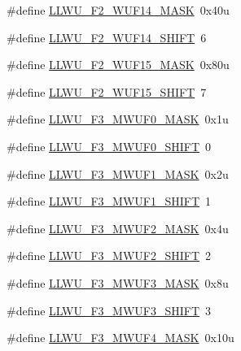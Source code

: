 \begin{DoxyCompactItemize}
\item 
\#define \hyperlink{group___l_l_w_u___register___masks_ga5f6f604b22d249edf1101cd9aa087072}{L\+L\+W\+U\+\_\+\+F2\+\_\+\+W\+U\+F14\+\_\+\+M\+A\+SK}~0x40u
\item 
\#define \hyperlink{group___l_l_w_u___register___masks_ga775751b74c858d4adf406ff063630bbf}{L\+L\+W\+U\+\_\+\+F2\+\_\+\+W\+U\+F14\+\_\+\+S\+H\+I\+FT}~6
\item 
\#define \hyperlink{group___l_l_w_u___register___masks_gaa56b2f78b177bd14e66b3863dbb14625}{L\+L\+W\+U\+\_\+\+F2\+\_\+\+W\+U\+F15\+\_\+\+M\+A\+SK}~0x80u
\item 
\#define \hyperlink{group___l_l_w_u___register___masks_gaae1c32b7e20bbc817c4c5af4479e2a91}{L\+L\+W\+U\+\_\+\+F2\+\_\+\+W\+U\+F15\+\_\+\+S\+H\+I\+FT}~7
\item 
\#define \hyperlink{group___l_l_w_u___register___masks_ga1bb6bf136de15f4cc67eee67d53361a9}{L\+L\+W\+U\+\_\+\+F3\+\_\+\+M\+W\+U\+F0\+\_\+\+M\+A\+SK}~0x1u
\item 
\#define \hyperlink{group___l_l_w_u___register___masks_ga3b2c7982efa30073491d05e0dbc698e8}{L\+L\+W\+U\+\_\+\+F3\+\_\+\+M\+W\+U\+F0\+\_\+\+S\+H\+I\+FT}~0
\item 
\#define \hyperlink{group___l_l_w_u___register___masks_gafe847acbd5a46291dd05b8ab682efffe}{L\+L\+W\+U\+\_\+\+F3\+\_\+\+M\+W\+U\+F1\+\_\+\+M\+A\+SK}~0x2u
\item 
\#define \hyperlink{group___l_l_w_u___register___masks_ga6de4a2380bde727b70758cd1c818c859}{L\+L\+W\+U\+\_\+\+F3\+\_\+\+M\+W\+U\+F1\+\_\+\+S\+H\+I\+FT}~1
\item 
\#define \hyperlink{group___l_l_w_u___register___masks_ga3414123c30550a3dea14d84f931e2a0c}{L\+L\+W\+U\+\_\+\+F3\+\_\+\+M\+W\+U\+F2\+\_\+\+M\+A\+SK}~0x4u
\item 
\#define \hyperlink{group___l_l_w_u___register___masks_gac83dee08de7a4bdce21d454a9cfab059}{L\+L\+W\+U\+\_\+\+F3\+\_\+\+M\+W\+U\+F2\+\_\+\+S\+H\+I\+FT}~2
\item 
\#define \hyperlink{group___l_l_w_u___register___masks_gab85f671f2c6f2112c4e2e14845ef998b}{L\+L\+W\+U\+\_\+\+F3\+\_\+\+M\+W\+U\+F3\+\_\+\+M\+A\+SK}~0x8u
\item 
\#define \hyperlink{group___l_l_w_u___register___masks_ga91a71ba06b95076252cd2594112da05d}{L\+L\+W\+U\+\_\+\+F3\+\_\+\+M\+W\+U\+F3\+\_\+\+S\+H\+I\+FT}~3
\item 
\#define \hyperlink{group___l_l_w_u___register___masks_gabd85c849a3b177444a91aa37457252a8}{L\+L\+W\+U\+\_\+\+F3\+\_\+\+M\+W\+U\+F4\+\_\+\+M\+A\+SK}~0x10u
\item 

\end{DoxyCompactItemize}
